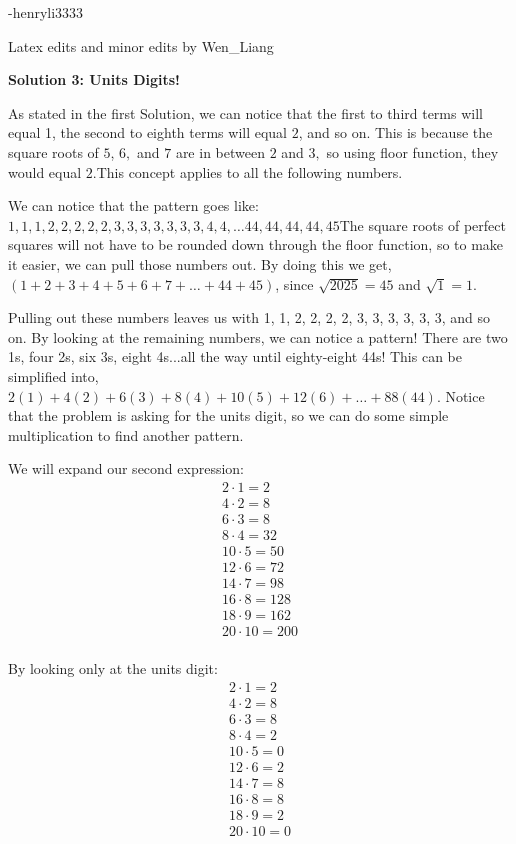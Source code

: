\begin{enumerate}
 -henryli3333

 Latex edits and minor edits by Wen\_Liang

 



\textbf{Solution 3: Units Digits!}

As stated in the first Solution, we can notice that the first to third terms will equal 1, the second to eighth terms will equal $2$, and so on. This is because the square roots of $5$, $6,$ and $7$ are in between $2$ and $3,$ so using floor function, they would equal $2$.This concept applies to all the following numbers.

 We can notice that the pattern goes like:$1, 1, 1, 2, 2, 2, 2, 2, 3, 3, 3, 3, 3, 3, 3, 4, 4,\dots44, 44, 44, 44, 45$The square roots of perfect squares will not have to be rounded down through the floor function, so to make it easier, we can pull those numbers out. By doing this we get, $(1+2+3+4+5+6+7+\dots+44+45)$, since $\sqrt{2025} = 45$ and $\sqrt{1} = 1$. 

 Pulling out these numbers leaves us with 1, 1, 2, 2, 2, 2, 3, 3, 3, 3, 3, 3, and so on. By looking at the remaining numbers, we can notice a pattern! There are two 1s, four 2s, six 3s, eight 4s...all the way until eighty-eight 44s! This can be simplified into, $2(1)+4(2)+6(3)+8(4)+10(5)+12(6)+\dots+88(44)$. Notice that the problem is asking for the units digit, so we can do some simple multiplication to find another pattern. 

 We will expand our second expression:\begin{align*}2\cdot1=2 \\4\cdot2=8 \\6\cdot3=8 \\8\cdot4=32 \\10\cdot5=50 \\12\cdot6=72 \\14\cdot7=98 \\16\cdot8=128 \\18\cdot9=162 \\20\cdot10=200 \\\end{align*}


 By looking only at the units digit:\begin{align*}2\cdot1=2 \\4\cdot2=8 \\6\cdot3=8 \\8\cdot4=2 \\10\cdot5=0 \\12\cdot6=2 \\14\cdot7=8 \\16\cdot8=8 \\18\cdot9=2 \\20\cdot10=0 \\\end{align*}



\end{enumerate}
